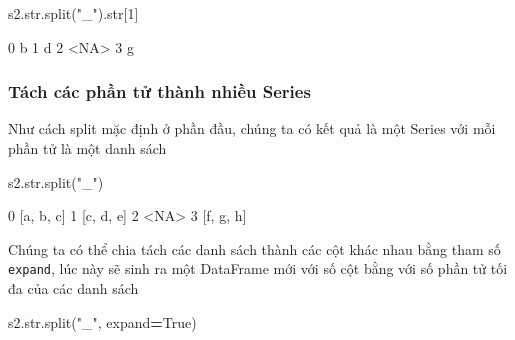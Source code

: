 \documentclass[
]{book}
\newenvironment{Shaded}{\begin{snugshade}}{\end{snugshade}}
\newcommand{\BuiltInTok}[1]{#1}
\newcommand{\DecValTok}[1]{\textcolor[rgb]{0.00,0.00,0.81}{#1}}
\newcommand{\NormalTok}[1]{#1}
\newcommand{\OperatorTok}[1]{\textcolor[rgb]{0.81,0.36,0.00}{\textbf{#1}}}
\newcommand{\StringTok}[1]{\textcolor[rgb]{0.31,0.60,0.02}{#1}}
\newcommand{\VariableTok}[1]{\textcolor[rgb]{0.00,0.00,0.00}{#1}}
\begin{document}
\begin{Shaded}
\begin{Highlighting}[]
\NormalTok{s2.}\BuiltInTok{str}\NormalTok{.split(}\StringTok{"\_"}\NormalTok{).}\BuiltInTok{str}\NormalTok{[}\DecValTok{1}\NormalTok{]}
\end{Highlighting}
\end{Shaded}

\begin{Shaded}
\begin{Highlighting}[]
\NormalTok{0       b​}
\NormalTok{1       d​}
\NormalTok{2    \textless{}NA\textgreater{}​}
\NormalTok{3       g}
\end{Highlighting}
\end{Shaded}

\subsubsection*{Tách các phần tử thành nhiều Series}\label{tuxe1ch-cuxe1c-phux1ea7n-tux1eed-thuxe0nh-nhiux1ec1u-series}


Như cách split mặc định ở phần đầu, chúng ta có kết quả là một Series với mỗi phần tử là một danh sách

\begin{Shaded}
\begin{Highlighting}[]
\NormalTok{s2.}\BuiltInTok{str}\NormalTok{.split(}\StringTok{"\_"}\NormalTok{)}
\end{Highlighting}
\end{Shaded}

\begin{Shaded}
\begin{Highlighting}[]
\NormalTok{0    [a, b, c]​}
\NormalTok{1    [c, d, e]​}
\NormalTok{2         \textless{}NA\textgreater{}​}
\NormalTok{3    [f, g, h]​}
\end{Highlighting}
\end{Shaded}

Chúng ta có thể chia tách các danh sách thành các cột khác nhau bằng tham số \texttt{expand}, lúc này sẽ sinh ra một DataFrame mới với số cột bằng với số phần tử tối đa của các danh sách

\begin{Shaded}
\begin{Highlighting}[]
\NormalTok{s2.}\BuiltInTok{str}\NormalTok{.split(}\StringTok{"\_"}\NormalTok{, expand}\OperatorTok{=}\VariableTok{True}\NormalTok{)​}
\end{Highlighting}
\end{Shaded}
\end{document}
